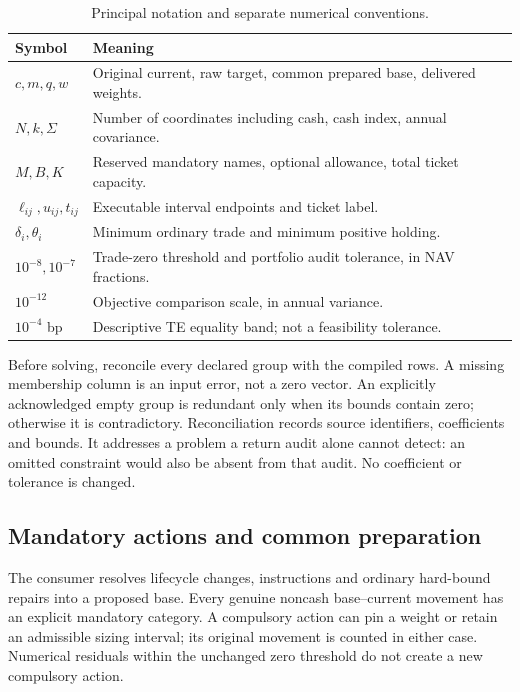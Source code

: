 \documentclass[preprint,12pt,authoryear]{elsarticle}
\begin{document}
\begin{table}[htbp]\centering\small
\caption{Principal notation and separate numerical conventions.}\label{tab:notation}
\begin{tabularx}{\linewidth}{lY}\toprule
Symbol & Meaning\\\midrule
$c,m,q,w$ & Original current, raw target, common prepared base, delivered weights.\\
$N,k,\Sigma$ & Number of coordinates including cash, cash index, annual covariance.\\
$M,B,K$ & Reserved mandatory names, optional allowance, total ticket capacity.\\
$\ell_{ij},u_{ij},t_{ij}$ & Executable interval endpoints and ticket label.\\
$\delta_i,\theta_i$ & Minimum ordinary trade and minimum positive holding.\\
$10^{-8},10^{-7}$ & Trade-zero threshold and portfolio audit tolerance, in NAV fractions.\\
$10^{-12}$ & Objective comparison scale, in annual variance.\\
$10^{-4}$ bp & Descriptive TE equality band; not a feasibility tolerance.\\
\bottomrule\end{tabularx}\end{table}

Before solving, reconcile every declared group with the compiled rows. A missing
membership column is an input error, not a zero vector. An explicitly acknowledged
empty group is redundant only when its bounds contain zero; otherwise it is
contradictory. Reconciliation records source identifiers, coefficients and bounds.
It addresses a problem a return audit alone cannot detect: an omitted constraint
would also be absent from that audit. No coefficient or tolerance is changed.

\subsection{Mandatory actions and common preparation}
The consumer resolves lifecycle changes, instructions and ordinary hard-bound
repairs into a proposed base. Every genuine noncash base--current movement has
an explicit mandatory category. A compulsory action can pin a weight or retain
an admissible sizing interval; its original movement is counted in either case.
Numerical residuals within the unchanged zero threshold do not create a new
compulsory action.
\end{document}
